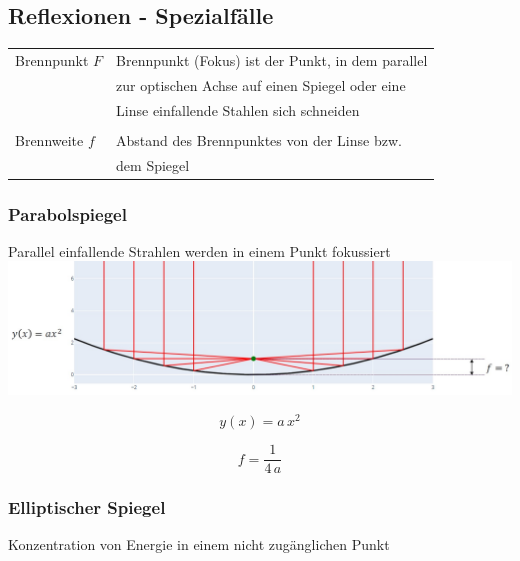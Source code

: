 \subsection{Reflexionen - Spezialfälle}

\begin{tabular}{ll}
Brennpunkt $F$ & Brennpunkt (Fokus) ist der Punkt, in dem parallel \\
 		       & zur optischen Achse auf einen Spiegel oder eine \\
 		       & Linse einfallende Stahlen sich schneiden \\
 		   \\
Brennweite $f$ & Abstand des Brennpunktes von der Linse bzw. \\
		       & dem Spiegel
\end{tabular}


\subsubsection{Parabolspiegel}
Parallel einfallende Strahlen werden in einem Punkt fokussiert \\


\includegraphics[width=0.9\linewidth]{Bilder/Wellen-Optik/parabolspiegel} \\

\begin{minipage}{0.48\linewidth}
$$ \boxed{ y(x) = a \, x^2 } $$ 
\end{minipage}
\hfill
\begin{minipage}{0.48\linewidth}
$$ \boxed{ f = \frac{1}{4 \, a} } $$
\end{minipage}





\subsubsection{Elliptischer Spiegel}

Konzentration von Energie in einem nicht zugänglichen Punkt \\

